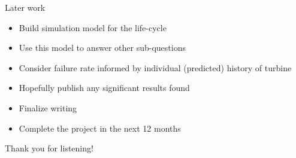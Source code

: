\documentclass{beamer}
\begin{document}
\begin{frame}{Later work}
\begin{itemize}
\item Build simulation model for the life-cycle
\item Use this model to answer other sub-questions
\item Consider failure rate informed by individual (predicted) history of turbine
\end{itemize}

\bigskip

\begin{itemize}
\item Hopefully publish any significant results found
\item Finalize writing
\item Complete the project in the next 12 months
\end{itemize}

\bigskip

\pause
\begin{center}
 Thank you for listening!
\end{center}
\end{frame}
\end{document}

